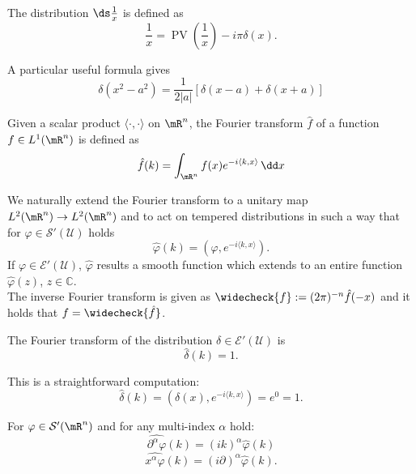 The distribution $\ds\frac{1}{x}$ is defined as
\begin{equation}
	\frac{1}{x}=\operatorname{PV}\left(\frac{1}{x}\right)-i\pi\delta(x).
\end{equation}

A particular useful formula gives
\begin{equation}
	\delta(x^2-a^2)=\frac{1}{2|a|}[\delta(x-a)+\delta(x+a)]
	\label{eq:delta1}
\end{equation}

Given a scalar product $\langle\cdot,\cdot\rangle$ on $\mR^n$, the Fourier transform $\hat{f}$ of a function $f\in L^1(\mR^n)$ is defined as
\begin{equation}
	\hat{f}(k)=\int_{\mR^n}f(x)e^{-i\langle k,x\rangle}\,\dd x
\end{equation}

We naturally extend the Fourier transform to a unitary map $L^2(\mR^n)\to L^2(\mR^n)$ and to act on tempered distributions in such a way that for $\varphi\in\mathcal{S}'(\mathcal{U})$ holds
\[	\hat{\varphi}(k)=\left(\varphi,e^{-i\langle k,x\rangle}\right).		\]
If $\varphi\in\mathcal{E}'(\mathcal{U})$, $\hat{\varphi}$ results a smooth function which extends to an entire function $\hat{\varphi}(z)$, $z\in\mathbb{C}$.\\

The inverse Fourier transform is given as $\widecheck{f}:=(2\pi)^{-n}\hat{f}(-x)$ and it holds that $f=\widecheck{\hat{f}}$.

\begin{prop}
	The Fourier transform of the distribution $\delta\in\mathcal{E}'(\mathcal{U})$ is
	\begin{equation}
		\hat{\delta}(k)=1.
	\end{equation}
\end{prop}
\Proof This is a straightforward computation:
\[\hat{\delta}(k)=(\delta(x),e^{-i\langle k,x\rangle})=e^0=1.\]\endproof

\begin{prop}
For $\varphi\in\mathcal{S}'(\mR^n)$ and for any multi-index $\alpha$ hold:
\[\hat{\partial^\alpha\varphi }(k)=(ik)^\alpha \hat{\varphi}(k)   \]
\[\hat{x^\alpha\varphi}(k)=(i\partial)^\alpha\hat{\varphi}(k).   \]
\end{prop}



